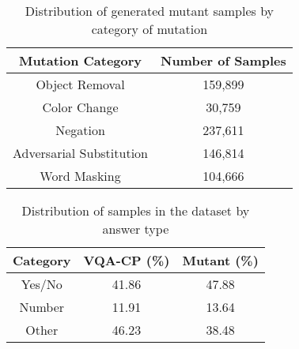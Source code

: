\begin{table}[t]
    \centering
    \small
    \begin{tabular}{@{}cc@{}}
        \toprule
        \textbf{Mutation Category} & \textbf{Number of Samples}\\
        \toprule
        Object Removal  & 159,899\\
        Color Change    & 30,759 \\
        Negation        & 237,611 \\
        Adversarial Substitution & 146,814 \\
        Word Masking & 104,666\\
        \bottomrule
    \end{tabular}

    \caption{Distribution of generated mutant samples by category of mutation}
    \label{tab:mutant_type}
\end{table}


\begin{table}[t]
    \centering
    \small
    \begin{tabular}{| c | c | c |}
        \hline
        \textbf{Category} & \textbf{VQA-CP (\%)} & \textbf{Mutant (\%)}\\
        \hline 
        Yes/No & 41.86 & 47.88 \\
        Number & 11.91 & 13.64 \\
        Other  & 46.23 & 38.48 \\
        \hline
    \end{tabular}
    \caption{Distribution of samples in the dataset by answer type}
    \label{tab:ans_type}
\end{table}


